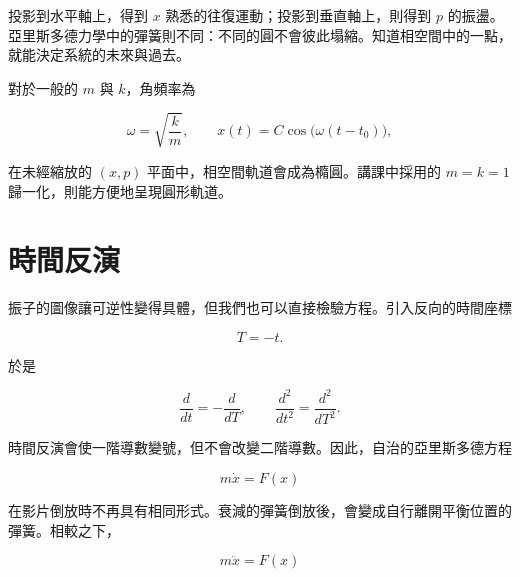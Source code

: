 投影到水平軸上，得到 \(x\) 熟悉的往復運動；投影到垂直軸上，則得到 \(p\) 的振盪。亞里斯多德力學中的彈簧則不同：不同的圓不會彼此塌縮。知道相空間中的一點，就能決定系統的未來與過去。

對於一般的 \(m\) 與 \(k\)，角頻率為

\begin{equation}
  \omega=\sqrt{\frac{k}{m}},
  \qquad
  x(t)=C\cos\bigl(\omega(t-t_0)\bigr),
  \label{eq:general-oscillator-frequency}
\end{equation}

在未經縮放的 \((x,p)\) 平面中，相空間軌道會成為橢圓。講課中採用的 \(m=k=1\) 歸一化，則能方便地呈現圓形軌道。

\begin{classroomqa}
\end{classroomqa}

\section{時間反演}

振子的圖像讓可逆性變得具體，但我們也可以直接檢驗方程。引入反向的時間座標

\begin{equation}
  T=-t.
  \label{eq:reverse-time}
\end{equation}

於是

\begin{equation}
  \frac{d}{dt}=-\frac{d}{dT},
  \qquad
  \frac{d^2}{dt^2}=\frac{d^2}{dT^2}.
  \label{eq:time-derivative-parity}
\end{equation}

時間反演會使一階導數變號，但不會改變二階導數。因此，自治的亞里斯多德方程

\begin{equation}
  m\dot x=F(x)
  \label{eq:aristotle-time-reversal}
\end{equation}

在影片倒放時不再具有相同形式。衰減的彈簧倒放後，會變成自行離開平衡位置的彈簧。相較之下，

\begin{equation}
  m\ddot x=F(x)
  \label{eq:newton-time-reversal}
\end{equation}

